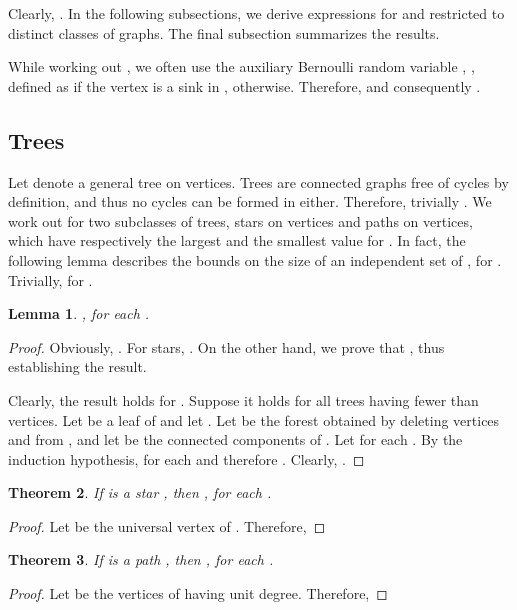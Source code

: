 \documentclass{article}
\newtheorem{lem}{Lemma}
\newtheorem{thm}[lem]{Theorem}
\begin{document}
Clearly, . In the following
subsections, we derive expressions for  and 
restricted to distinct classes of graphs. The final subsection summarizes the
results.

While working out , we often use the auxiliary Bernoulli random
variable , , defined as  if the vertex  is a sink
in ,  otherwise. Therefore,  and
consequently
.

\subsection{Trees}

Let  denote a general tree on  vertices. Trees are connected graphs free
of cycles by definition, and thus no cycles can be formed in  either.
Therefore, trivially . We work out  for two
subclasses of trees, stars  on  vertices and paths  on 
vertices, which have respectively the largest and the smallest value for
. In fact, the following lemma describes the bounds on the size of
an independent set of , for . Trivially,  for
.

\begin{lem}
\label{WTnWPn}
, for each
.
\end{lem}

\begin{proof}
Obviously, . For stars, . On the
other hand, we prove that
, thus establishing
the result.

Clearly, the result holds for . Suppose it holds for all trees having
fewer than  vertices. Let  be a leaf of  and let
. Let  be the forest obtained by deleting vertices  and
 from , and let  be the connected components of .
Let  for each . By the induction hypothesis,
 for each  and therefore
. Clearly,
.
\end{proof}

\begin{thm}
\label{EXSn}
If  is a star , then
, for each .
\end{thm}

\begin{proof}
Let  be the universal vertex of . Therefore,

\end{proof}

\begin{thm}
\label{EXPn}
If  is a path , then , for each
.
\end{thm}

\begin{proof}
Let  be the vertices of  having unit degree. Therefore,

\end{proof}
\end{document}
